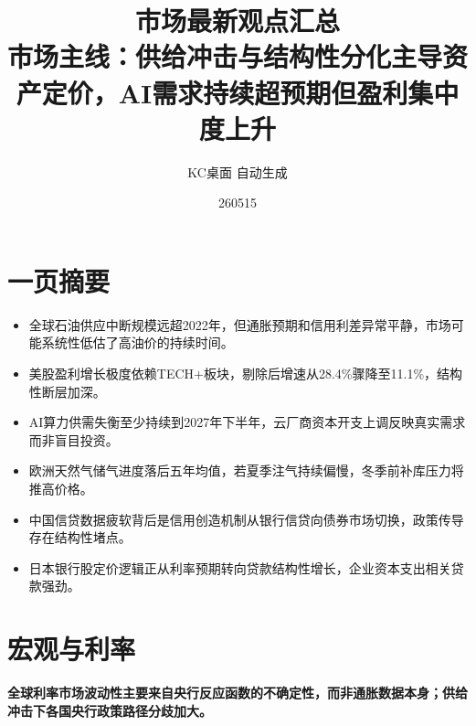 \documentclass[11pt]{ctexart}
\title{\textbf{市场最新观点汇总}\\[0.4em]{\large 市场主线：供给冲击与结构性分化主导资产定价，AI需求持续超预期但盈利集中度上升}}
\author{KC桌面 自动生成}
\date{260515}
\begin{document}
\maketitle
\section*{一页摘要}
\begin{itemize}
  \item 全球石油供应中断规模远超2022年，但通胀预期和信用利差异常平静，市场可能系统性低估了高油价的持续时间。
  \item 美股盈利增长极度依赖TECH+板块，剔除后增速从28.4\%骤降至11.1\%，结构性断层加深。
  \item AI算力供需失衡至少持续到2027年下半年，云厂商资本开支上调反映真实需求而非盲目投资。
  \item 欧洲天然气储气进度落后五年均值，若夏季注气持续偏慢，冬季前补库压力将推高价格。
  \item 中国信贷数据疲软背后是信用创造机制从银行信贷向债券市场切换，政策传导存在结构性堵点。
  \item 日本银行股定价逻辑正从利率预期转向贷款结构性增长，企业资本支出相关贷款强劲。
\end{itemize}
\section{宏观与利率}
\textbf{全球利率市场波动性主要来自央行反应函数的不确定性，而非通胀数据本身；供给冲击下各国央行政策路径分歧加大。}
\end{document}
